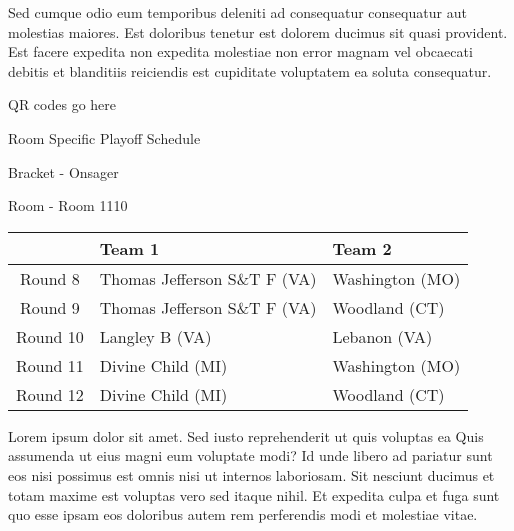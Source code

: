 \documentclass{article}%
\begin{document}
\newline%
Sed cumque odio eum temporibus deleniti ad consequatur consequatur aut molestias maiores. Est doloribus tenetur est dolorem ducimus sit quasi provident. Est facere expedita non expedita molestiae non error magnam vel obcaecati debitis et blanditiis reiciendis est cupiditate voluptatem ea soluta consequatur.%
\vspace*{140pt}%
\begin{center}%
\begin{Huge}%
QR codes go here%
\end{Huge}%
\end{center}%
\newpage%
\begin{center}%
\begin{Huge}%
Room Specific Playoff Schedule%
\end{Huge}%
\vspace*{8pt}%
\linebreak%
\begin{Large}%
Bracket {-} Onsager%
\end{Large}%
\vspace*{8pt}%
\linebreak%
\vspace*{8pt}%
\begin{Large}%
Room {-} Room 1110%
\end{Large}%
\end{center}%
%
\begin{tabularx}{\textwidth}{|c|Y|Y|}%
\hline%
&Team 1&Team 2\\%
\hline%
Round 8&Thomas Jefferson S\&T F (VA)&Washington (MO)\\%
Round 9&Thomas Jefferson S\&T F (VA)&Woodland (CT)\\%
Round 10&Langley B (VA)&Lebanon (VA)\\%
Round 11&Divine Child (MI)&Washington (MO)\\%
Round 12&Divine Child (MI)&Woodland (CT)\\%
\hline%
\end{tabularx}%
\vspace*{8pt}%
\newline%
Lorem ipsum dolor sit amet. Sed iusto reprehenderit ut quis voluptas ea Quis assumenda ut eius magni eum voluptate modi? Id unde libero ad pariatur sunt eos nisi possimus est omnis nisi ut internos laboriosam. Sit nesciunt ducimus et totam maxime est voluptas vero sed itaque nihil. Et expedita culpa et fuga sunt quo esse ipsam eos doloribus autem rem perferendis modi et molestiae vitae.\newline%
\end{document}
